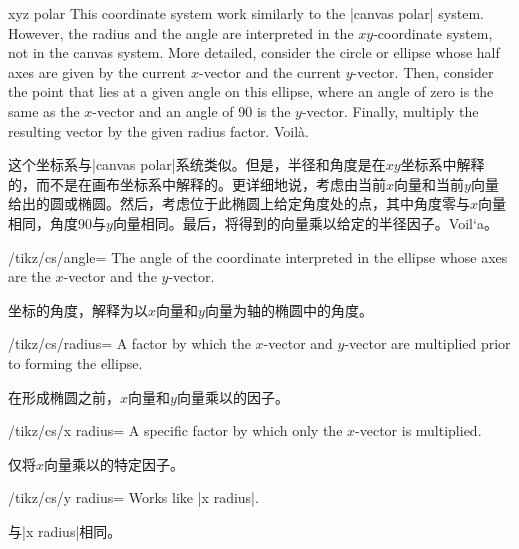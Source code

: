 \begin{coordinatesystem}{xyz polar}
    This coordinate system work similarly to the |canvas polar| system.
    However, the radius and the angle are interpreted in the $xy$-coordinate
    system, not in the canvas system. More detailed, consider the circle or
    ellipse whose half axes are given by the current $x$-vector and the current
    $y$-vector. Then, consider the point that lies at a given angle on this
    ellipse, where an angle of zero is the same as the $x$-vector and an angle
    of 90 is the $y$-vector. Finally, multiply the resulting vector by the
    given radius factor. Voil\`a.
    
    这个坐标系与|canvas polar|系统类似。但是，半径和角度是在$xy$坐标系中解释的，而不是在画布坐标系中解释的。更详细地说，考虑由当前$x$向量和当前$y$向量给出的圆或椭圆。然后，考虑位于此椭圆上给定角度处的点，其中角度零与$x$向量相同，角度90与$y$向量相同。最后，将得到的向量乘以给定的半径因子。Voil`a。

%
    \begin{key}{/tikz/cs/angle=}
        The angle of the coordinate interpreted in the ellipse whose axes are
        the $x$-vector and the $y$-vector.

        坐标的角度，解释为以$x$向量和$y$向量为轴的椭圆中的角度。

    \end{key}
    \begin{key}{/tikz/cs/radius=}
        A factor by which the $x$-vector and $y$-vector are multiplied prior to
        forming the ellipse.

        在形成椭圆之前，$x$向量和$y$向量乘以的因子。

    \end{key}
    \begin{key}{/tikz/cs/x radius=}
        A specific factor by which only the $x$-vector is multiplied.
    
        仅将$x$向量乘以的特定因子。
    \end{key}
    \begin{key}{/tikz/cs/y radius=}
        Works like |x radius|.

        与|x radius|相同。

    \end{key}
\begin{codeexample}[]
\end{codeexample}
\end{coordinatesystem}
